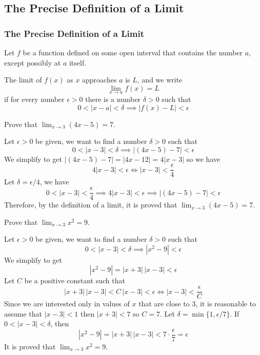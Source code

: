 \subsection{The Precise Definition of a Limit}

\subsubsection*{The Precise Definition of a Limit}
Let \(f\) be a function defined on some open interval that contains the number
\(a\), except possibly at \(a\) itself.
\begin{definition}
    The limit of \(f(x)\) as \(x\) approaches \(a\) is \(L\), and we write
    \[\lim_{x\to a}f(x)=L\]
    if for every number \(\epsilon>0\) there is a number \(\delta>0\) such that
    \[0<|x-a|<\delta\implies|f(x)-L|<\epsilon\]
\end{definition}
\begin{problem}
    Prove that \(\displaystyle{\lim_{x\to 3}(4x-5)=7}\).
\end{problem}
\begin{solution}
    Let \(\epsilon>0\) be given, we want to find a number \(\delta>0\) such
    that
    \[0<|x-3|<\delta \implies|(4x-5)-7|<\epsilon\]
    We simplify to get \(|(4x-5)-7|=|4x-12|=4|x-3|\) so we have
    \[4|x-3|<\epsilon\iff|x-3|<\frac{\epsilon}{4}\]
    Let \(\delta=\epsilon/4\), we have
    \[0<|x-3|<\frac{\epsilon}{4}\implies4|x-3|<\epsilon\implies
    |(4x-5)-7|<\epsilon\]
    Therefore, by the definition of a limit, it is proved that
    \(\displaystyle{\lim_{x\to 3}(4x-5)=7}\).
\end{solution}
\begin{problem}
    Prove that \(\displaystyle{\lim_{x\to 3}x^2=9}\).
\end{problem}
\begin{solution}
    Let \(\epsilon>0\) be given, we want to find a number \(\delta>0\) such
    that
    \[0<|x-3|<\delta\implies|x^2-9|<\epsilon\]
    We simplify to get \[|x^2-9|=|x+3|\,|x-3|<\epsilon\]
    Let \(C\) be a positive constant such that
    \[|x+3|\,|x-3|<C\,|x-3|<\epsilon \iff |x-3|<\frac{\epsilon}{C}\]
    Since we are interested only in values of \(x\) that are close to 3, it is
    reasonable to assume that \(|x-3|<1\) then \(|x+3|<7\) so \(C=7\).
    Let \(\delta=\min\{1,\epsilon/7\}\).
    If \(0<|x-3|<\delta\), then
    \[|x^2-9|=|x+3|\,|x-3|<7\cdot\frac{\epsilon}{7}=\epsilon\]
    It is proved that \(\displaystyle{\lim_{x\to 3}x^2=9}\).
\end{solution}

